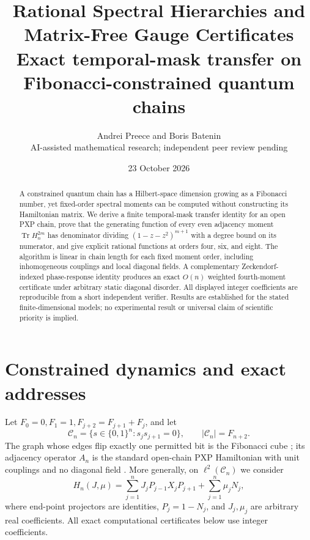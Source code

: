 \documentclass[10pt,a4paper]{article}
\title{\bfseries Rational Spectral Hierarchies and Matrix-Free Gauge Certificates\\[3pt]
\large Exact temporal-mask transfer on Fibonacci-constrained quantum chains}
\author{Andrei Preece and Boris Batenin\\[-1pt]
\small AI-assisted mathematical research; independent peer review pending}
\date{23 October 2026}
\newcommand{\C}{\mathcal C}
\newcommand{\Tr}{\operatorname{Tr}}
\begin{document}
\maketitle
\begin{abstract}
A constrained quantum chain has a Hilbert-space dimension growing as a Fibonacci number, yet fixed-order spectral moments can be computed without constructing its Hamiltonian matrix. We derive a finite temporal-mask transfer identity for an open PXP chain, prove that the generating function of every even adjacency moment $\Tr H_n^{2m}$ has denominator dividing $(1-z-z^2)^{m+1}$ with a degree bound on its numerator, and give explicit rational functions at orders four, six, and eight. The algorithm is linear in chain length for each fixed moment order, including inhomogeneous couplings and local diagonal fields. A complementary Zeckendorf-indexed phase-response identity produces an exact $O(n)$ weighted fourth-moment certificate under arbitrary static diagonal disorder. All displayed integer coefficients are reproducible from a short independent verifier. Results are established for the stated finite-dimensional models; no experimental result or universal claim of scientific priority is implied.
\end{abstract}

\section{Constrained dynamics and exact addresses}
Let $F_0=0,F_1=1,F_{j+2}=F_{j+1}+F_j$, and let
\begin{equation}\label{eq:words}
\C_n=\{s\in\{0,1\}^n:s_j s_{j+1}=0\},\qquad |\C_n|=F_{n+2}.
\end{equation}
The graph whose edges flip exactly one permitted bit is the Fibonacci cube \cite{hsu,klavzar}; its adjacency operator $A_n$ is the standard open-chain PXP Hamiltonian with unit couplings and no diagonal field \cite{turner}. More generally, on $\ell^2(\C_n)$ we consider
\begin{equation}\label{eq:H}
H_n(J,\mu)=\sum_{j=1}^n J_j P_{j-1}X_jP_{j+1}
+\sum_{j=1}^n\mu_j N_j,
\end{equation}
where end-point projectors are identities, $P_j=1-N_j$, and $J_j,\mu_j$ are arbitrary real coefficients. All exact computational certificates below use integer coefficients.
\end{document}

